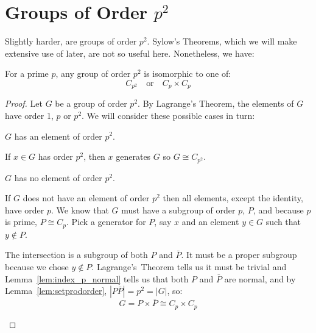 \section{Groups of Order \(p^2\)}
Slightly harder, are groups of order \(p^2\).
Sylow's Theorems, which we will make extensive use of later, are not so useful here.
Nonetheless, we have:

\begin{theorem}
    For a prime \(p\), any group of order \(p^2\) is isomorphic to one of:
    \[C_{p^2} \quad \text{or} \quad C_p \times C_p\]
\end{theorem}

\begin{proof}
    Let \(G\) be a group of order \(p^2\).
    By Lagrange's Theorem, the elements of \(G\) have order 1, \(p\) or \(p^2\).
    We will consider these possible cases in turn:

    \begin{case}
    \item \(G\) has an element of order \(p^2\).

        If \(x \in G\) has order \(p^2\), then \(x\) generates \(G\) so \(G \cong C_{p^2}\).

    \item \(G\) has no element of order \(p^2\).

        If \(G\) does not have an element of order \(p^2\) then all elements, except the identity, have order \(p\).
        We know that \(G\) must have a subgroup of order \(p\), \(P\), and because \(p\) is prime, \(P \cong C_p\). Pick
        a generator for \(P\), say \(x\) and an element \(y \in G\) such that \(y \notin P\).

        The intersection is a subgroup of both \(P\) and \(\bar{P}\).
        It must be a proper subgroup because we chose \(y \notin P\).
        Lagrange's~Theorem tells us it must be trivial and Lemma~\ref{lem:index_p_normal} tells us that both \(P\) and
        \(\bar{P}\) are normal, and by Lemma~\ref{lem:setprodorder}, \(|P\bar{P}| = p^2 = |G|\), so:
        \[G = P \times \bar{P} \cong C_p \times C_p\]
    \end{case}
\end{proof}


